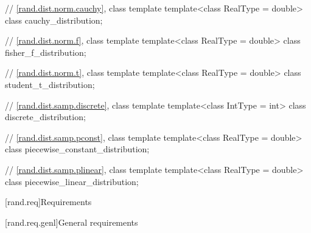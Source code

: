 \begin{codeblock}
{  // \ref{rand.dist.norm.cauchy}, class template 
  template<class RealType = double>
    class cauchy_distribution;

  // \ref{rand.dist.norm.f}, class template 
  template<class RealType = double>
    class fisher_f_distribution;

  // \ref{rand.dist.norm.t}, class template 
  template<class RealType = double>
    class student_t_distribution;

  // \ref{rand.dist.samp.discrete}, class template 
  template<class IntType = int>
    class discrete_distribution;

  // \ref{rand.dist.samp.pconst}, class template 
  template<class RealType = double>
    class piecewise_constant_distribution;

  // \ref{rand.dist.samp.plinear}, class template 
  template<class RealType = double>
    class piecewise_linear_distribution;
}
\end{codeblock}%
%



[rand.req]{Requirements}%


[rand.req.genl]{General requirements}%

